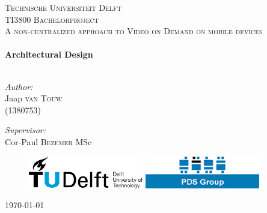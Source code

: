 \begin{titlepage}

\begin{center}



\textsc{\Large Technische Universiteit Delft }\\[1.5cm]
\textsc{\large TI3800 Bachelorproject}\\[0.5cm]
\textsc{\normalsize A non-centralized approach to Video on Demand on mobile devices}\\[0.5cm]


\HRule \\[0.4cm]
{ \huge \bfseries Architectural Design}\\[0.4cm]

\HRule \\[1.5cm]

\begin{minipage}{0.4\textwidth}
\begin{flushleft} \large
\emph{Author:}\\
Jaap \textsc{van Touw} \\(1380753)\\ [0.1cm]
\end{flushleft}
\end{minipage}
\begin{minipage}{0.4\textwidth}
\begin{flushright} \large
\emph{Supervisor:} \\
Cor-Paul \textsc{Bezemer} MSc
\end{flushright}
\end{minipage}
\vspace{30mm}
\begin{figure}[ht!]
\centering
\includegraphics[width=50mm]{TUDLogo.png}
\hspace{10mm}
\includegraphics[width=50mm]{pdslogo.png}
\label{overflow}
\end{figure}
\vfill

{\large \today}

\end{center}

\end{titlepage}
